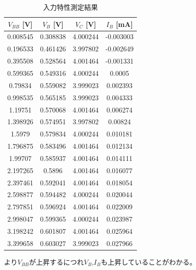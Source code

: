 \documentclass[11pt,dvipdfmx]{jarticle}
\begin{document}
		\begin{table}[H]
			\centering
			\caption{入力特性測定結果}
			\begin{tabular}{cccc}
			\hline
			$V_{BB}$ [V] & $V_B$ [V]& $V_C$ [V]& $I_B$ [mA]\\ \hline\hline
			0.008545 & 0.308838 & 4.000244 & -0.003003 \\
			0.196533 & 0.461426 & 3.997802 & -0.002649 \\
			0.395508 & 0.528564 & 4.001464 & -0.001331 \\
			0.599365 & 0.549316 & 4.000244 & 0.0005 \\
			0.79834 & 0.559082 & 3.999023 & 0.002393 \\
			0.998535 & 0.565185 & 3.999023 & 0.004333 \\
			1.19751 & 0.570068 & 4.001464 & 0.006274 \\
			1.398926 & 0.574951 & 3.997802 & 0.00824 \\
			1.5979 & 0.579834 & 4.000244 & 0.010181 \\
			1.796875 & 0.583496 & 4.001464 & 0.012134 \\
			1.99707 & 0.585937 & 4.001464 & 0.014111 \\
			2.197265 & 0.5896 & 4.001464 & 0.016077 \\
			2.397461 & 0.592041 & 4.001464 & 0.018054 \\
			2.598877 & 0.594482 & 4.000244 & 0.020044 \\
			2.797851 & 0.596924 & 4.001464 & 0.022009 \\
			2.998047 & 0.599365 & 4.000244 & 0.023987 \\
			3.198242 & 0.601807 & 4.001464 & 0.025964 \\
			3.399658 & 0.603027 & 3.999023 & 0.027966 \\
			\hline
			\end{tabular}
			\label{tab:入力特性測定結果}
		\end{table}
		より$V_{BB}$が上昇するにつれ$V_B$,$I_B$も上昇していることがわかる。
\end{document}
